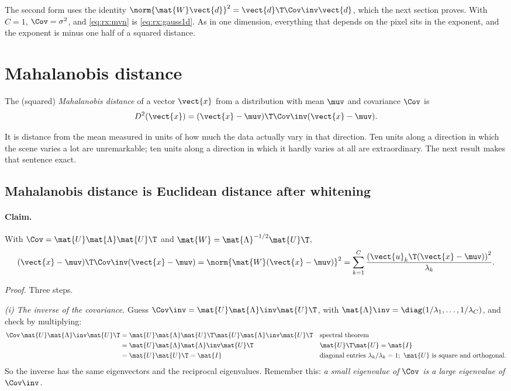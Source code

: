 The second form uses the identity $\norm{\mat{W}\vect{d}}^2 = \vect{d}\T\Cov\inv\vect{d}$, which the
next section proves. With $C = 1$, $\Cov = \sigma^2$, and \cref{eq:rx:mvn} is \cref{eq:rx:gauss1d}.
As in one dimension, everything that depends on the pixel sits in the exponent, and the exponent
is minus one half of a squared distance.

\section{Mahalanobis distance}\label{sec:rx:mahalanobis}

\begin{definition}
The (squared) \emph{Mahalanobis distance} of a vector $\vect{x}$ from a distribution with mean
$\muv$ and covariance $\Cov$ is
\begin{equation}\label{eq:rx:maha}
D^2(\vect{x}) = (\vect{x} - \muv)\T\Cov\inv(\vect{x} - \muv).
\end{equation}
\end{definition}

It is distance from the mean measured in units of how much the data actually vary in that
direction. Ten units along a direction in which the scene varies a lot are unremarkable; ten units
along a direction in which it hardly varies at all are extraordinary. The next result makes that
sentence exact.

\subsection{Mahalanobis distance is Euclidean distance after whitening}

\paragraph{Claim.} With $\Cov = \mat{U}\mat{\Lambda}\mat{U}\T$ and
$\mat{W} = \mat{\Lambda}^{-1/2}\mat{U}\T$,
\begin{equation}\label{eq:rx:mahawhite}
(\vect{x} - \muv)\T\Cov\inv(\vect{x} - \muv) = \norm{\mat{W}(\vect{x} - \muv)}^2
= \sum_{k=1}^{C}\frac{\left(\vect{u}_k\T(\vect{x} - \muv)\right)^2}{\lambda_k}.
\end{equation}

\noindent\textit{Proof.} Three steps.

\emph{(i) The inverse of the covariance.} Guess $\Cov\inv = \mat{U}\mat{\Lambda}\inv\mat{U}\T$, with
$\mat{\Lambda}\inv = \diag(1/\lambda_1, \dots, 1/\lambda_C)$, and check by multiplying:
\begin{align*}
\Cov\,\mat{U}\mat{\Lambda}\inv\mat{U}\T
&= \mat{U}\mat{\Lambda}\mat{U}\T\mat{U}\mat{\Lambda}\inv\mat{U}\T
  && \text{spectral theorem}\\
&= \mat{U}\mat{\Lambda}\mat{\Lambda}\inv\mat{U}\T
  && \mat{U}\T\mat{U} = \mat{I}\\
&= \mat{U}\mat{U}\T = \mat{I}
  && \text{diagonal entries } \lambda_k/\lambda_k = 1;\ \mat{U}\text{ is square and orthogonal.}
\end{align*}
So the inverse has the same eigenvectors and the reciprocal eigenvalues. Remember this: \emph{a
small eigenvalue of $\Cov$ is a large eigenvalue of $\Cov\inv$.}

